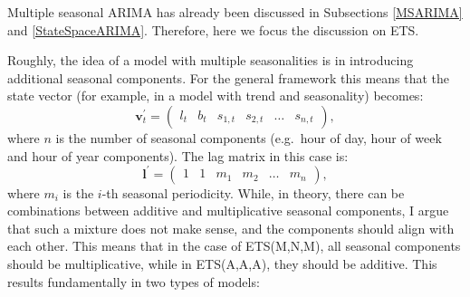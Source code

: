 \documentclass[
]{book}
\theoremstyle{definition}
\theoremstyle{definition}
\theoremstyle{definition}
\theoremstyle{definition}
\theoremstyle{remark}
\begin{document}
Multiple seasonal ARIMA has already been discussed in Subsections \ref{MSARIMA} and \ref{StateSpaceARIMA}. Therefore, here we focus the discussion on ETS.

Roughly, the idea of a model with multiple seasonalities is in introducing additional seasonal components. For the general framework this means that the state vector (for example, in a model with trend and seasonality) becomes:
\begin{equation}
  \mathbf{v}_t^\prime =
    \begin{pmatrix}
    l_t & b_t & s_{1,t} & s_{2,t} & \dots & s_{n,t}
    \end{pmatrix},
  \label{eq:ETSADAMSeasonalMultiStateVector}
\end{equation}
where \(n\) is the number of seasonal components (e.g.~hour of day, hour of week and hour of year components). The lag matrix in this case is:
\begin{equation}
  \mathbf{l}^\prime=\begin{pmatrix}1 & 1 & m_1 & m_2 & \dots & m_n \end{pmatrix},
  \label{eq:ETSADAMSeasonalMultiStateVectorLags}
\end{equation}
where \(m_i\) is the \(i\)-th seasonal periodicity. While, in theory, there can be combinations between additive and multiplicative seasonal components, I argue that such a mixture does not make sense, and the components should align with each other. This means that in the case of ETS(M,N,M), all seasonal components should be multiplicative, while in ETS(A,A,A), they should be additive. This results fundamentally in two types of models:
\end{document}
